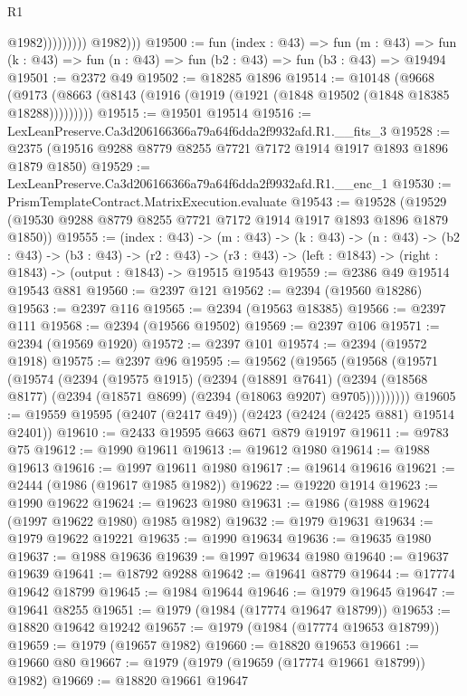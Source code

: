 \begin{lexlean}{R1}
\begin{coremodule}
                            @1982)))))))))
          @1982)))
@19500 := fun (index : @43) =>
  fun (m : @43) => fun (k : @43) => fun (n : @43) => fun (b2 : @43) => fun (b3 : @43) => @19494
@19501 := @2372 @49
@19502 := @18285 @1896
@19514 := @10148
    (@9668 (@9173 (@8663 (@8143 (@1916 (@1919 (@1921 (@1848 @19502 (@1848 @18385 @18288)))))))))
@19515 := @19501 @19514
@19516 := LexLeanPreserve.Ca3d206166366a79a64f6dda2f9932afd.R1.__fits_3
@19528 := @2375 (@19516 @9288 @8779 @8255 @7721 @7172 @1914 @1917 @1893 @1896 @1879 @1850)
@19529 := LexLeanPreserve.Ca3d206166366a79a64f6dda2f9932afd.R1.__enc_1
@19530 := PrismTemplateContract.MatrixExecution.evaluate
@19543 := @19528 (@19529 (@19530 @9288 @8779 @8255 @7721 @7172 @1914 @1917 @1893 @1896 @1879 @1850))
@19555 := (index : @43) ->
  (m : @43) ->
  (k : @43) ->
  (n : @43) ->
  (b2 : @43) ->
  (b3 : @43) ->
  (r2 : @43) -> (r3 : @43) -> (left : @1843) -> (right : @1843) -> (output : @1843) -> @19515 @19543
@19559 := @2386 @49 @19514 @19543 @881
@19560 := @2397 @121
@19562 := @2394 (@19560 @18286)
@19563 := @2397 @116
@19565 := @2394 (@19563 @18385)
@19566 := @2397 @111
@19568 := @2394 (@19566 @19502)
@19569 := @2397 @106
@19571 := @2394 (@19569 @1920)
@19572 := @2397 @101
@19574 := @2394 (@19572 @1918)
@19575 := @2397 @96
@19595 := @19562
    (@19565
      (@19568
        (@19571
          (@19574
            (@2394
              (@19575 @1915)
              (@2394
                (@18891 @7641)
                (@2394 (@18568 @8177) (@2394 (@18571 @8699) (@2394 (@18063 @9207) @9705)))))))))
@19605 := @19559 @19595 (@2407 (@2417 @49)) (@2423 (@2424 (@2425 @881) @19514 @2401))
@19610 := @2433 @19595 @663 @671 @879 @19197
@19611 := @9783 @75
@19612 := @1990 @19611
@19613 := @19612 @1980
@19614 := @1988 @19613
@19616 := @1997 @19611 @1980
@19617 := @19614 @19616
@19621 := @2444 (@1986 (@19617 @1985 @1982))
@19622 := @19220 @1914
@19623 := @1990 @19622
@19624 := @19623 @1980
@19631 := @1986 (@1988 @19624 (@1997 @19622 @1980) @1985 @1982)
@19632 := @1979 @19631
@19634 := @1979 @19622 @19221
@19635 := @1990 @19634
@19636 := @19635 @1980
@19637 := @1988 @19636
@19639 := @1997 @19634 @1980
@19640 := @19637 @19639
@19641 := @18792 @9288
@19642 := @19641 @8779
@19644 := @17774 @19642 @18799
@19645 := @1984 @19644
@19646 := @1979 @19645
@19647 := @19641 @8255
@19651 := @1979 (@1984 (@17774 @19647 @18799))
@19653 := @18820 @19642 @19242
@19657 := @1979 (@1984 (@17774 @19653 @18799))
@19659 := @1979 (@19657 @1982)
@19660 := @18820 @19653
@19661 := @19660 @80
@19667 := @1979 (@1979 (@19659 (@17774 @19661 @18799)) @1982)
@19669 := @18820 @19661 @19647

\end{coremodule}
\end{lexlean}
